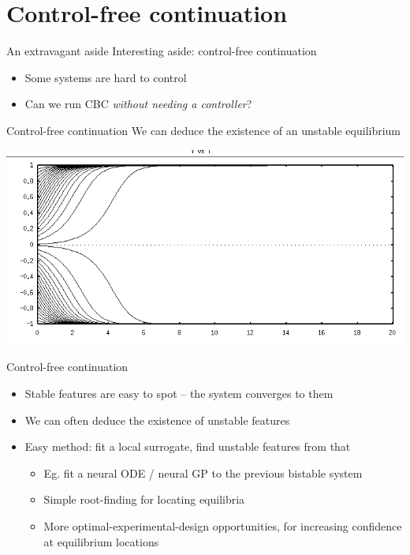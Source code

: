 \documentclass[presentation]{beamer}
\begin{document}
\section{Control-free continuation}
\label{sec:org4315617}
\begin{frame}[label={sec:org6741ee9}]{An extravagant aside}
Interesting aside: control-free continuation
\vfill
\begin{itemize}
\item Some systems are hard to control
\item Can we run CBC \emph{without needing a controller}?
\end{itemize}
\end{frame}

\begin{frame}[label={sec:orgee95c0f}]{Control-free continuation}
We can deduce the existence of an unstable equilibrium

\begin{center}
\includegraphics[width=.9\linewidth]{./bistable.png}
\end{center}
\end{frame}

\begin{frame}[<+->][label={sec:org8f8bcb1}]{Control-free continuation}
\begin{itemize}
\item Stable features are easy to spot -- the system converges to them
\item We can often deduce the existence of unstable features
\item Easy method: fit a local surrogate, find unstable features from that
\begin{itemize}
\item Eg. fit a neural ODE / neural GP to the previous bistable system
\item Simple root-finding for locating equilibria
\item More optimal-experimental-design opportunities, for increasing confidence at equilibrium locations
\end{itemize}
\end{itemize}
\end{frame}
\end{document}

